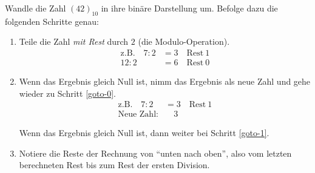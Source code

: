 \documentclass[10pt, a5paper]{arbeitsblatt}
\begin{document}
\ReiheTitel

\begin{aufgabe}
	Wandle die Zahl $(42)_{10}$ in ihre binäre Darstellung um. Befolge
	dazu die folgenden Schritte genau:
	\begin{enumerate}
		\item \label{goto-0} Teile die Zahl \emph{mit Rest} durch
		      $2$ (die Modulo-Operation).
		      \begin{align*}
			      \text{z.B.}\quad7 : 2 & = 3 \quad\text{Rest}\ 1 \\
			      12 : 2                & = 6 \quad\text{Rest}\ 0
		      \end{align*}
		\item Wenn das Ergebnis gleich Null ist, nimm das Ergebnis als neue Zahl und gehe
		      wieder zu Schritt \ref{goto-0}.
		      \begin{align*}
			      \text{z.B.}\quad7 : 2 & = 3 \quad\text{Rest}\ 1 \\
			      \text{Neue Zahl:}     & \quad 3
		      \end{align*}

		      Wenn das Ergebnis gleich Null ist, dann weiter bei Schritt
		      \ref{goto-1}.
		\item \label{goto-1} Notiere die Reste der
		      Rechnung von \enquote{unten nach oben}, also vom letzten berechneten Rest bis zum
		      Rest der ersten Division.
	\end{enumerate}
\end{aufgabe}

\newpage
\ReiheTitel
\end{document}
